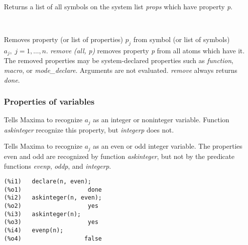 \documentclass[../Maxima_Workbook.tex]{subfiles}
\begin{document}
\lzz {} \hfill \tcr{[function]}

\lz Returns a list of all symbols on the system list \emph{props} which have property \emph{p}.

\lzz {} \\
 \hfill \tcr{[function]}

\lz Removes property (or list of properties) $ p_j $ from symbol (or list of symbols) $ a_j, \; j=1,\dots,n $. \emph{remove (all, p)} removes property \emph{p} from all atoms which have it. The removed properties may be system-declared properties such as \emph{function}, \emph{macro}, or \emph{mode\_declare}. Arguments are not evaluated. \emph{remove} always returns \emph{done}.

\subsubsection{Properties of variables}

\lz {} \hfill \tcr{[property]}

 \hfill \tcr{[property]}

\lz Tells Maxima to recognize $ a_j $ as an integer or noninteger variable. Function \emph{askinteger} recognize this property, but \emph{integerp} does not.

\lzz {} \hfill \tcr{[property]}

 \hfill \tcr{[property]}

\lz Tells Maxima to recognize $ a_j $ as an even or odd integer variable. The properties even and odd are recognized by function \emph{askinteger}, but not by the predicate functions \emph{evenp}, \emph{oddp}, and \emph{integerp}.

\lz \begin{lstlisting}[basicstyle=\small]
(%i1) 	declare(n, even);
(%o1) 				    done
(%i2) 	askinteger(n, even);
(%o2) 				    yes
(%i3) 	askinteger(n);
(%o3) 				    yes
(%i4) 	evenp(n);
(%o4) 				   false
\end{lstlisting}

\lzz {} \hfill \tcr{[property]}
\end{document}
